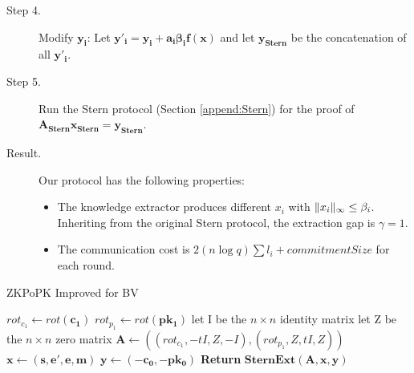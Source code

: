 \begin{description}
\item [Step 4.] Modify $\mathbf{y_i}$: Let $\mathbf{y'_i} = \mathbf{y_i + a_i\beta_if(x)}$ and let $\mathbf{y_{Stern}}$ be
  the concatenation of all $\mathbf{y'_i}$.


\item [Step 5.] Run the Stern protocol (Section \ref{append:Stern}) for the proof of $\mathbf{A_{Stern}x_{Stern} = y_{Stern}}$.

\item [Result.] Our protocol has the following properties:
  \begin{itemize}
  \item The knowledge extractor produces different $x_i$ with $\Vert x_i \Vert_{\infty} \leq \beta_i$. Inheriting from the original
    Stern protocol, the extraction gap is $\gamma = 1$.
  \item The communication cost is $2(n\log q){\sum{l_i}} + commitmentSize$ for each round.
  \end{itemize}

\end{description}

  \begin{algorithm}
    \caption{ZKPoPK Improved for BV}\label{alg:ZKPBVImproved}
    \begin{algorithmic}[1]
      \State $rot_{c_1} \gets rot(\mathbf{c_1})$
      \State $rot_{p_1} \gets rot(\mathbf{pk_1})$
      \State let I be the $n \times n$ identity matrix
      \State let Z be the $n \times n $ zero matrix
      \State $\mathbf{A} \gets ((rot_{c_1},-tI, Z, -I),(rot_{p_1}, Z, tI,Z)) $
      \State $\mathbf{x} \gets (\mathbf{s, e', e, m})$
      \State $\mathbf{y} \gets (\mathbf{-c_0, -pk_0})$
      \State \textbf{Return} $\mathbf{SternExt(A,x,y)}$
      \EndProcedure
    \end{algorithmic}
  \end{algorithm}



